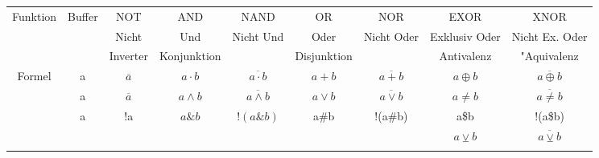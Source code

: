 \begin{table}
\begin{tabular}{|c|c|c|c|c|c|c|c|c|}
\hline
Funktion & Buffer & NOT & AND & NAND & OR & NOR & EXOR & XNOR\\
& & Nicht & Und & Nicht Und & Oder & Nicht Oder & Exklusiv Oder & Nicht Ex. Oder\\
& & Inverter & Konjunktion & & Disjunktion & & Antivalenz & "Aquivalenz \\
\hline
Formel & a & $ \overline a $ & $ a \cdot b $ & $ \overline{a \cdot b} $ & $ a + b $ & $ \overline{a + b} $ & $ a \oplus b $ & $ \overline{a \oplus b} $\\
& a & $ \overline a $ & $ a \wedge b $ & $ \overline{a \wedge b} $ & $ a \vee b $ & $ \overline{a \vee b} $ & $ a \not= b $ & $ \overline{a \not= b} $ \\
& a & !a & $ a \& b $ & $ !(a \& b) $ & a\#b & !(a\#b) & a\$b & !(a\$b) \\
& & & & & & & $ a \veebar b $ & $ \overline{a \veebar b} $\\
\hline
& & & & & & & &\\

\end{tabular}
\end{table}
